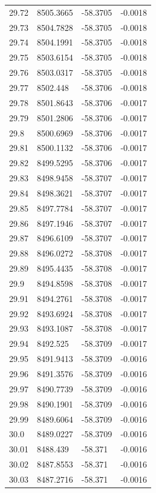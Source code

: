 \begin{table}[H]
\begin{tabular}{llll}
29.72 & 8505.3665 & -58.3705 & -0.0018 \\
29.73 & 8504.7828 & -58.3705 & -0.0018 \\
29.74 & 8504.1991 & -58.3705 & -0.0018 \\
29.75 & 8503.6154 & -58.3705 & -0.0018 \\
29.76 & 8503.0317 & -58.3705 & -0.0018 \\
29.77 & 8502.448 & -58.3706 & -0.0018 \\
29.78 & 8501.8643 & -58.3706 & -0.0017 \\
29.79 & 8501.2806 & -58.3706 & -0.0017 \\
29.8 & 8500.6969 & -58.3706 & -0.0017 \\
29.81 & 8500.1132 & -58.3706 & -0.0017 \\
29.82 & 8499.5295 & -58.3706 & -0.0017 \\
29.83 & 8498.9458 & -58.3707 & -0.0017 \\
29.84 & 8498.3621 & -58.3707 & -0.0017 \\
29.85 & 8497.7784 & -58.3707 & -0.0017 \\
29.86 & 8497.1946 & -58.3707 & -0.0017 \\
29.87 & 8496.6109 & -58.3707 & -0.0017 \\
29.88 & 8496.0272 & -58.3708 & -0.0017 \\
29.89 & 8495.4435 & -58.3708 & -0.0017 \\
29.9 & 8494.8598 & -58.3708 & -0.0017 \\
29.91 & 8494.2761 & -58.3708 & -0.0017 \\
29.92 & 8493.6924 & -58.3708 & -0.0017 \\
29.93 & 8493.1087 & -58.3708 & -0.0017 \\
29.94 & 8492.525 & -58.3709 & -0.0017 \\
29.95 & 8491.9413 & -58.3709 & -0.0016 \\
29.96 & 8491.3576 & -58.3709 & -0.0016 \\
29.97 & 8490.7739 & -58.3709 & -0.0016 \\
29.98 & 8490.1901 & -58.3709 & -0.0016 \\
29.99 & 8489.6064 & -58.3709 & -0.0016 \\
30.0 & 8489.0227 & -58.3709 & -0.0016 \\
30.01 & 8488.439 & -58.371 & -0.0016 \\
30.02 & 8487.8553 & -58.371 & -0.0016 \\
30.03 & 8487.2716 & -58.371 & -0.0016 \\

\end{tabular}
\end{table}

